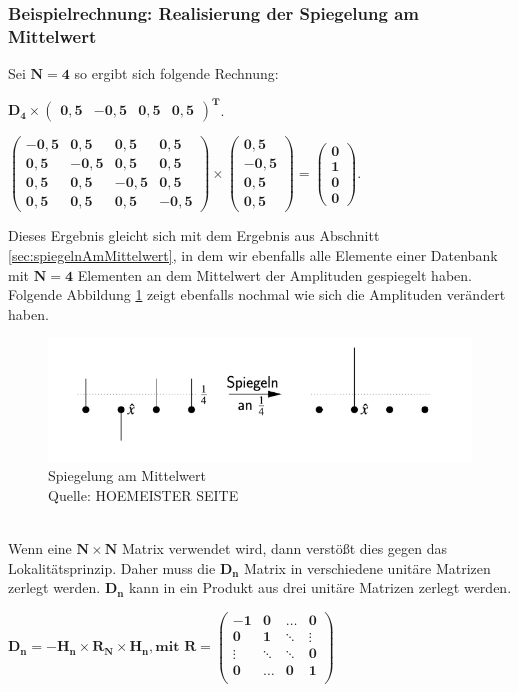 \subsubsection{Beispielrechnung: Realisierung der Spiegelung am Mittelwert}
Sei $\mathbf{N = 4}$ so ergibt sich folgende Rechnung:
\begin{center}
 $\mathbf{D_4  \times \begin{pmatrix}
		0,5 & -0,5 & 0,5 & 0,5
\end{pmatrix}^T}$.

$\mathbf{\begin{pmatrix}
		-0,5 & 0,5 &0,5&0,5\\
		0,5 & -0,5 &0,5&0,5\\
		0,5 & 0,5 &-0,5&0,5\\
		0,5 & 0,5 &0,5&-0,5
	\end{pmatrix}
	\times \begin{pmatrix} 0,5 \\ -0,5 \\ 0,5 \\ 0,5 \end{pmatrix} = \begin{pmatrix} 0\\1\\0\\0 \end{pmatrix}
}$.
\end{center}
Dieses Ergebnis gleicht sich mit dem Ergebnis aus Abschnitt \ref{sec:spiegelnAmMittelwert}, in dem wir ebenfalls alle Elemente einer Datenbank mit $\mathbf{N=4}$ Elementen an dem Mittelwert der Amplituden gespiegelt haben. Folgende Abbildung \ref{fig:spiegelung} zeigt ebenfalls nochmal wie sich die Amplituden verändert haben.
\begin{figure}[hbtp]
	\centering
	\includegraphics[width=.8\textwidth]{figures/spiegelung.png}
	\caption{Spiegelung am Mittelwert \\ Quelle: HOEMEISTER SEITE}
	\label{fig:spiegelung}
\end{figure}
\noindent
\\
Wenn eine $\mathbf{N \times N}$ Matrix verwendet wird, dann verstößt dies gegen das Lokalitätsprinzip. Daher muss die $\mathbf{D_n}$ Matrix in verschiedene unitäre Matrizen zerlegt werden.  $\mathbf{D_n}$ kann in ein Produkt aus drei unitäre Matrizen zerlegt werden.
\begin{center}
$\mathbf{D_n = -H_n \times R_N \times H_n, \text{mit } R  = 
\begin{pmatrix}
		-1 & 0 &\dots& 0 \\
		0& 1& \ddots& \vdots\\
		\vdots &\ddots& \ddots&0 \\
		0& \dots& 0 &1 \\
\end{pmatrix}}$
\end{center}
